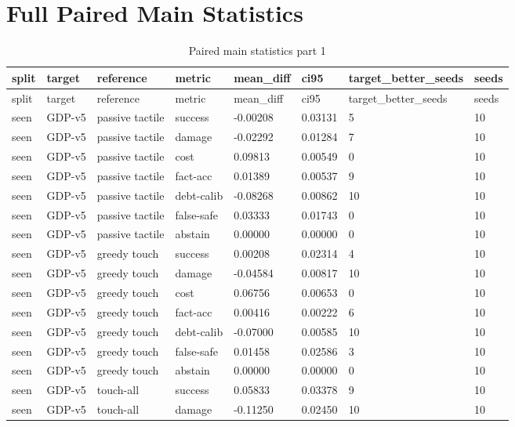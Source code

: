 \documentclass{article}
\begin{document}
\section{Full Paired Main Statistics}

\begin{center}
\tiny
\renewcommand{\arraystretch}{0.92}
\setlength{\tabcolsep}{3pt}
\begin{longtable}{llllllll}
\caption{Paired main statistics part 1}\label{tab:paired-main-statistics-1}\\
\toprule
split & target & reference & metric & mean\_diff & ci95 & target\_better\_seeds & seeds \\
\midrule
\endfirsthead
\toprule
split & target & reference & metric & mean\_diff & ci95 & target\_better\_seeds & seeds \\
\midrule
\endhead
seen & GDP-v5 & passive tactile & success & -0.00208 & 0.03131 & 5 & 10 \\
seen & GDP-v5 & passive tactile & damage & -0.02292 & 0.01284 & 7 & 10 \\
seen & GDP-v5 & passive tactile & cost & 0.09813 & 0.00549 & 0 & 10 \\
seen & GDP-v5 & passive tactile & fact-acc & 0.01389 & 0.00537 & 9 & 10 \\
seen & GDP-v5 & passive tactile & debt-calib & -0.08268 & 0.00862 & 10 & 10 \\
seen & GDP-v5 & passive tactile & false-safe & 0.03333 & 0.01743 & 0 & 10 \\
seen & GDP-v5 & passive tactile & abstain & 0.00000 & 0.00000 & 0 & 10 \\
seen & GDP-v5 & greedy touch & success & 0.00208 & 0.02314 & 4 & 10 \\
seen & GDP-v5 & greedy touch & damage & -0.04584 & 0.00817 & 10 & 10 \\
seen & GDP-v5 & greedy touch & cost & 0.06756 & 0.00653 & 0 & 10 \\
seen & GDP-v5 & greedy touch & fact-acc & 0.00416 & 0.00222 & 6 & 10 \\
seen & GDP-v5 & greedy touch & debt-calib & -0.07000 & 0.00585 & 10 & 10 \\
seen & GDP-v5 & greedy touch & false-safe & 0.01458 & 0.02586 & 3 & 10 \\
seen & GDP-v5 & greedy touch & abstain & 0.00000 & 0.00000 & 0 & 10 \\
seen & GDP-v5 & touch-all & success & 0.05833 & 0.03378 & 9 & 10 \\
seen & GDP-v5 & touch-all & damage & -0.11250 & 0.02450 & 10 & 10 \\

\end{longtable}
\end{center}
\end{document}
